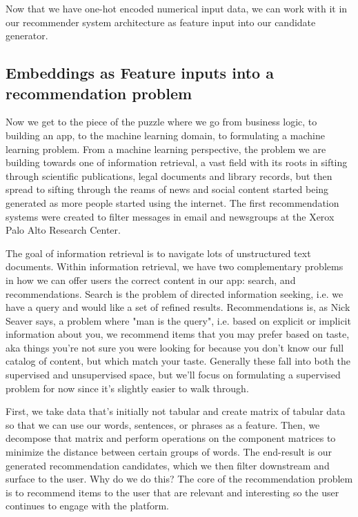 \documentclass[draft, 11pt]{diazessay} %
\begin{document}
Now that we have one-hot encoded numerical input data, we can work with it in our recommender system architecture as feature input into our candidate generator.

\subsection{Embeddings as Feature inputs into a recommendation problem}
Now we get to the piece of the puzzle where we go from business logic, to building an app, to the machine learning domain, to formulating a machine learning problem. From a machine learning perspective, the problem we are building towards one of  information retrieval, a vast field with its roots in sifting through scientific publications, legal documents and library records, but then spread to sifting through the reams of news and social content started being generated as more people started using the internet. The first recommendation systems were created to filter messages in email and newsgroups\citep{goldberg1992using}  at the Xerox Palo Alto Research Center. 
	
The goal of information retrieval is to navigate lots of unstructured text documents. Within information retrieval, we have two complementary problems in how we can offer users the correct content in our app: search, and recommendations. Search is the problem of directed\citep{ekstrand2019recommender} information seeking, i.e. we have a query and would like a set of refined results. Recommendations is, as Nick Seaver \citep{seaver2022computing} says, a problem where "man is the query", i.e. based on explicit or implicit information about you, we recommend items that you may prefer based on taste, aka things you're not sure you were looking for because you don't know our full catalog of content, but which match your taste.  Generally these fall into both the supervised and unsupervised space, but we'll focus on formulating a supervised problem for now since it's slightly easier to walk through. 

 First, we take data that’s initially not tabular and create matrix of tabular data so that we can use our words, sentences, or phrases as a feature. Then, we decompose that matrix and perform operations on the component matrices to minimize the distance between certain groups of words. The end-result is our generated recommendation candidates, which we then filter downstream and surface to the user.  Why do we do this? The core of the recommendation problem is to recommend items to the user that are relevant and interesting so the user continues to engage with the platform. 
\end{document}
